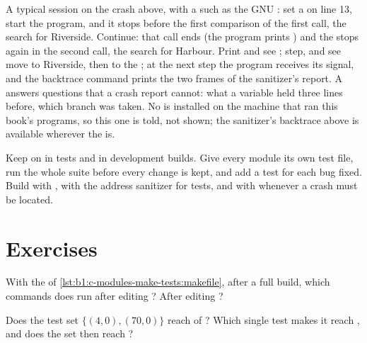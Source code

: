 A typical session on the crash above, with a  such as the GNU : set a  on line 13, start the
program, and it stops before the first comparison of the first call, the search for Riverside. Continue: that call
ends (the program prints ) and the  stops again in the second call, the search for Harbour.
Print  and see ; step, and see  move to Riverside, then to the
; at the next step the program receives its signal, and the backtrace command
prints the two frames of the sanitizer's report. A  answers questions that a crash report cannot: what a
variable held three lines before, which branch was taken. No  is installed on the machine that ran this
book's programs, so this one is told, not shown; the sanitizer's backtrace above is available wherever the  is.

\begin{safety}
Keep  on in tests and in development builds. Give every module its own test file, run the whole suite
before every change is kept, and add a test for each bug fixed. Build with , with the address
sanitizer for tests, and with  whenever a crash must be located.
\end{safety}

\section{Exercises}\label{sec:b1:c-modules-make-tests:exercises}

\begin{exercise}[$\star$]\label{exo:b1:c-modules-make-tests:1}
With the  of \cref{lst:b1:c-modules-make-tests:makefile}, after a full build, which commands does 
run after editing ? After editing ?
\end{exercise}

\begin{exercise}[$\star$]\label{exo:b1:c-modules-make-tests:2}
Does the test set $\{(4, 0), (70, 0)\}$ reach  of ? Which single test makes it reach
, and does the set then reach ?
\end{exercise}

